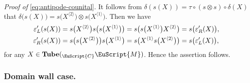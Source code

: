 \documentclass[a4paper,11pt]{article}
\theoremstyle{definition}
\theoremstyle{remark}
\newcommand\eC           {\EuScript{C}}
\newcommand\eM          {\EuScript{M}}
\begin{document}
\noindent
\textit{Proof of} \eqref{eq:antipode-counital}. It follows from $\delta(s(X)) = \tau\circ (s\otimes s)\circ\delta(X)$ that $\delta\bigl(s(X)\bigr) = s\bigl(X^{\langle 2 \rangle}\bigr) \otimes s\bigl(X^{\langle 1 \rangle}\bigr)$. Then we have 
    \begin{align}
        \varepsilon'_L(s(X)) &= s\bigl(X^{\langle 2 \rangle}\bigr) s\bigl(s\bigl(X^{\langle 1 \rangle}\bigr)\bigr) = s\bigl(s\bigl(X^{\langle 1 \rangle}\bigr)X^{\langle 2 \rangle}\bigr) = s\bigl(\varepsilon'_R(X)\bigr),     \notag\\
        \varepsilon'_R(s(X)) &= s\bigl(s\bigl(X^{\langle 2 \rangle}\bigr)\bigr) s\bigl(X^{\langle 1 \rangle}\bigr) = s\bigl(X^{\langle 1 \rangle}s\bigl(X^{\langle 2 \rangle}\bigr)\bigr) = s\bigl(\varepsilon'_L(X)\bigr),     \notag
    \end{align}
    for any $X\in \mathbf{Tube}({}_\eC\eM)$. Hence the assertion follows. 




\subsubsection*{Domain wall case.}
\end{document}
